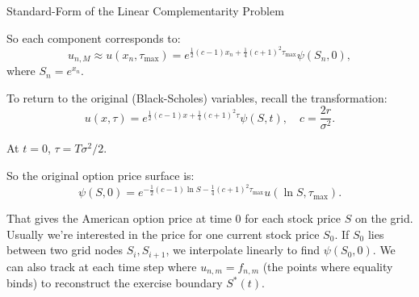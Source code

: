 \documentclass{beamer}
\begin{document}
\begin{frame}{Standard-Form of the Linear Complementarity Problem}

    {\footnotesize \footnotesize
     So each component corresponds to:
    \[
    u_{n, M} \approx u(x_n, \tau_{\max}) = e^{\frac{1}{2}(c-1)x_n + \frac{1}{4}(c+1)^2 \tau_{\max}} \psi(S_n, 0),
    \]
    where $S_n = e^{x_n}$.

        To return to the original (Black-Scholes) variables, recall the transformation:
    \[
    u(x, \tau) = e^{\frac{1}{2}(c-1)x + \frac{1}{4}(c+1)^2 \tau} \psi(S, t), \quad c = \frac{2r}{\sigma^2}.
    \]

    At $t = 0$, $\tau = T\sigma^2 / 2$.

    So the original option price surface is:
    \[
    \psi(S, 0) = e^{-\frac{1}{2}(c-1)\ln S - \frac{1}{4}(c+1)^2 \tau_{\max}} u(\ln S, \tau_{\max}).
    \]

    That gives the American option price at time 0 for each stock price $S$ on the grid.
    Usually we're interested in the price for one current stock price $S_0$. If $S_0$ 
    lies between two grid nodes $S_i, S_{i+1}$, we interpolate linearly to find $\psi(S_0, 0)$.
    We can also track at each time step where $u_{n,m} = f_{n,m}$ (the points where equality binds) to
     reconstruct the exercise boundary $S^*(t)$.
    }
\end{frame}
\end{document}
